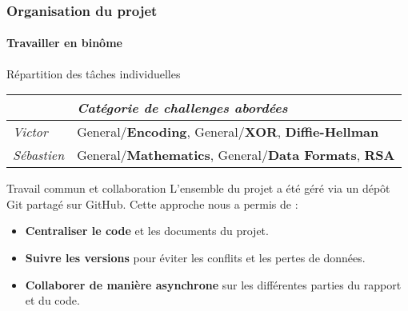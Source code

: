 \begin{frame}
    \frametitle{Organisation du projet}
    \framesubtitle{Travailler en binôme}

    \begin{block}{Répartition des tâches individuelles}
        \centering
        \small
        \begin{tabular}{ll} 
            \toprule
            \textbf{} & \textit{Catégorie de challenges abordées} \\
            \midrule
            \textit{Victor} & General/\textbf{Encoding}, General/\textbf{XOR}, \textbf{Diffie-Hellman} \\
            \textit{Sébastien} & General/\textbf{Mathematics}, General/\textbf{Data Formats}, \textbf{RSA} \\
            \bottomrule
        \end{tabular}
    \end{block}

    \vspace{0.5cm} %

    \begin{alertblock}{Travail commun et collaboration}
        L'ensemble du projet a été géré via un dépôt Git partagé sur GitHub. Cette approche nous a permis de :
        \begin{itemize}
            \item \textbf{Centraliser le code} et les documents du projet.
            \item \textbf{Suivre les versions} pour éviter les conflits et les pertes de données.
            \item \textbf{Collaborer de manière asynchrone} sur les différentes parties du rapport et du code.
        \end{itemize}
    \end{alertblock}

\end{frame}